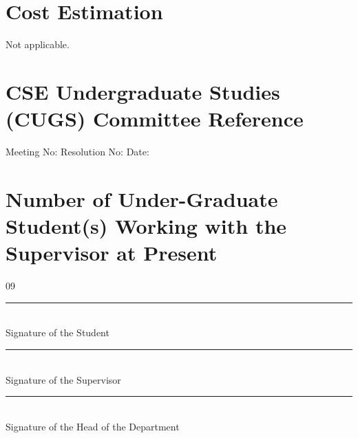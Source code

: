 \documentclass[12pt,a4paper]{article}
\begin{document}
\section{Cost Estimation}

Not applicable.

\newpage




\newpage


\section{CSE Undergraduate Studies (CUGS) Committee Reference}

{\hspace*{10mm}Meeting No: \hspace{20mm}
Resolution No:\hspace{25mm} Date:
}

\section{Number of Under-Graduate Student(s) Working with the Supervisor at Present}

\hspace{9mm} 09

\vspace{40mm}

\begin{flushright}
\noindent \rule{4.5cm}{0.4pt} \\
Signature of the Student

\bigskip
\bigskip
\bigskip
\bigskip

\noindent \rule{5cm}{0.4pt} \\
Signature of the Supervisor

\bigskip
\bigskip
\bigskip
\bigskip

\noindent \rule{7.4cm}{0.4pt} \\
Signature of the Head of the Department

\end{flushright}
\end{document}
